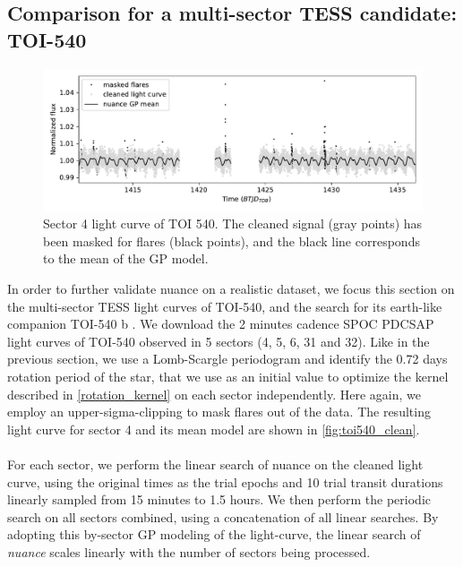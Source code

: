 \documentclass[modern]{aastex631}
\newcommand{\nuancemethod}{\textit{nuance}}
\newcommand{\nuance}{\nuancemethod{}}
\begin{document}
\subsection{Comparison for a multi-sector TESS candidate: TOI-540}\label{toi540}
\begin{figure}[H]
    \begin{centering}
        \includegraphics[width=\linewidth]{../workflows/comparison_toi/figures/TOI 540/4.pdf}
        \caption{Sector 4 light curve of TOI 540. The cleaned signal (gray points) has been masked for flares (black points), and the black line corresponds to the mean of the GP model.}
        \label{fig:toi540_clean}
    \end{centering}
\end{figure}
In order to further validate nuance on a realistic dataset, we focus this section on the multi-sector TESS light curves of TOI-540, and the search for its earth-like companion TOI-540 b \citep{TOI540}. We download the 2 minutes cadence SPOC PDCSAP light curves of TOI-540 observed in 5 sectors (4, 5, 6, 31 and 32). Like in the previous section, we use a Lomb-Scargle periodogram and identify the 0.72 days rotation period of the star, that we use as an initial value to optimize the kernel described in \autoref{rotation_kernel} on each sector independently. Here again, we employ an upper-sigma-clipping to mask flares out of the data. The resulting light curve for sector 4 and its mean model are shown in \autoref{fig:toi540_clean}.\\\\
For each sector, we perform the linear search of nuance on the cleaned light curve, using the original times as the trial epochs and 10 trial transit durations linearly sampled from 15 minutes to 1.5 hours. We then perform the periodic search on all sectors combined, using a concatenation of all linear searches. By adopting this by-sector GP modeling of the light-curve, the linear search of \nuance{} scales linearly with the number of sectors being processed.
\end{document}
